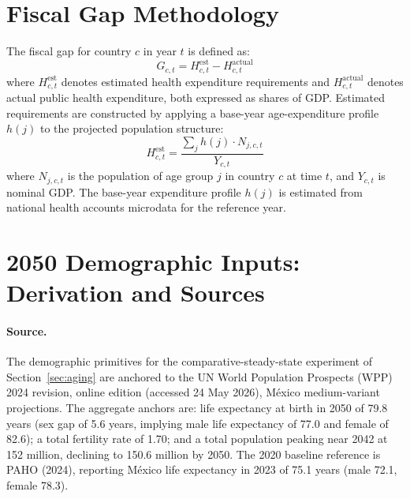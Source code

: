 \documentclass[12pt,a4paper]{article}
\begin{document}
\begin{appendices}

\section{Fiscal Gap Methodology}
\label{app:fiscal_gap}

The fiscal gap for country $c$ in year $t$ is defined as:
\begin{equation}
\label{eq:fiscal_gap}
G_{c,t} = H_{c,t}^{\text{est}} - H_{c,t}^{\text{actual}}
\end{equation}
where $H_{c,t}^{\text{est}}$ denotes estimated health expenditure requirements and $H_{c,t}^{\text{actual}}$ denotes actual public health expenditure, both expressed as shares of GDP. Estimated requirements are constructed by applying a base-year age-expenditure profile $h(j)$ to the projected population structure:
\begin{equation}
\label{eq:fiscal_gap_est}
H_{c,t}^{\text{est}} = \frac{\sum_j h(j) \cdot N_{j,c,t}}{Y_{c,t}}
\end{equation}
where $N_{j,c,t}$ is the population of age group $j$ in country $c$ at time $t$, and $Y_{c,t}$ is nominal GDP. The base-year expenditure profile $h(j)$ is estimated from national health accounts microdata for the reference year.


\section{2050 Demographic Inputs: Derivation and Sources}
\label{app:demog2050}

\paragraph{Source.} The demographic primitives for the comparative-steady-state experiment of Section~\ref{sec:aging} are anchored to the UN World Population Prospects (WPP) 2024 revision, online edition (accessed 24 May 2026), M\'exico medium-variant projections. The aggregate anchors are: life expectancy at birth in 2050 of 79.8 years (sex gap of 5.6 years, implying male life expectancy of 77.0 and female of 82.6); a total fertility rate of 1.70; and a total population peaking near 2042 at 152 million, declining to 150.6 million by 2050. The 2020 baseline reference is PAHO (2024), reporting M\'exico life expectancy in 2023 of 75.1 years (male 72.1, female 78.3).


\end{appendices}
\end{document}
